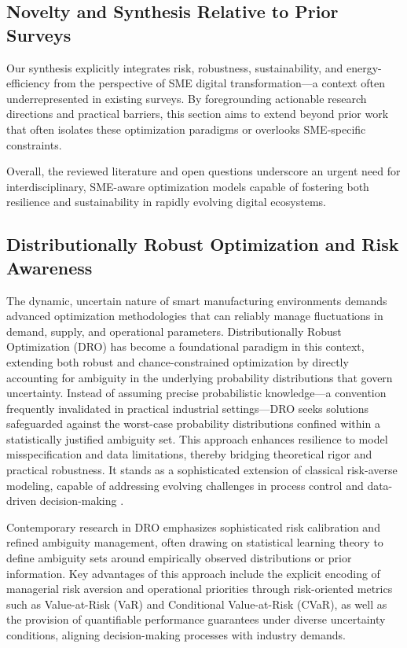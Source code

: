 \documentclass[sigconf]{acmart}
\begin{document}
\subsection{Novelty and Synthesis Relative to Prior Surveys}

Our synthesis explicitly integrates risk, robustness, sustainability, and energy-efficiency from the perspective of SME digital transformation—a context often underrepresented in existing surveys. By foregrounding actionable research directions and practical barriers, this section aims to extend beyond prior work that often isolates these optimization paradigms or overlooks SME-specific constraints.

Overall, the reviewed literature and open questions underscore an urgent need for interdisciplinary, SME-aware optimization models capable of fostering both resilience and sustainability in rapidly evolving digital ecosystems.

\subsection{Distributionally Robust Optimization and Risk Awareness}

The dynamic, uncertain nature of smart manufacturing environments demands advanced optimization methodologies that can reliably manage fluctuations in demand, supply, and operational parameters. Distributionally Robust Optimization (DRO) has become a foundational paradigm in this context, extending both robust and chance-constrained optimization by directly accounting for ambiguity in the underlying probability distributions that govern uncertainty. Instead of assuming precise probabilistic knowledge—a convention frequently invalidated in practical industrial settings—DRO seeks solutions safeguarded against the worst-case probability distributions confined within a statistically justified ambiguity set. This approach enhances resilience to model misspecification and data limitations, thereby bridging theoretical rigor and practical robustness. It stands as a sophisticated extension of classical risk-averse modeling, capable of addressing evolving challenges in process control and data-driven decision-making \cite{ref77}.

Contemporary research in DRO emphasizes sophisticated risk calibration and refined ambiguity management, often drawing on statistical learning theory to define ambiguity sets around empirically observed distributions or prior information. Key advantages of this approach include the explicit encoding of managerial risk aversion and operational priorities through risk-oriented metrics such as Value-at-Risk (VaR) and Conditional Value-at-Risk (CVaR), as well as the provision of quantifiable performance guarantees under diverse uncertainty conditions, aligning decision-making processes with industry demands.
\end{document}
